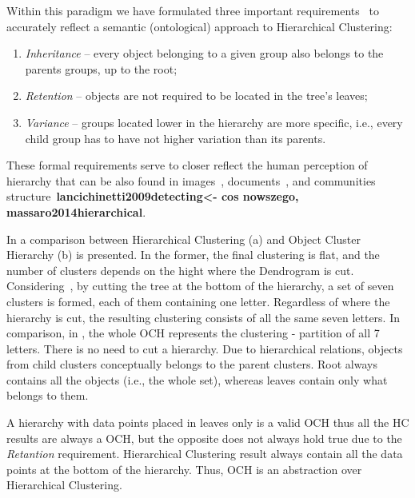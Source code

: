 \documentclass{article}
\begin{document}
    Within this paradigm we have formulated three important requirements~\cite{Spytkowski2012} to accurately reflect a semantic (ontological) approach to Hierarchical Clustering:
\begin{enumerate}
    \item {\textit{Inheritance} -- every object belonging to a given group also belongs to the parents groups, up to the root;}
    \item {\textit{Retention} -- objects are not required to be located in the tree’s leaves;}
    \item {\textit{Variance} -- groups located lower in the hierarchy are more specific, i.e., every child group has to have not higher variation than its parents.}
\end{enumerate}

These formal requirements serve to closer reflect the human perception of hierarchy that can be also found in images~\cite{ILSVRC15,ghahramani2010tree}, documents~\cite{ghahramani2010tree,2010_bayesian_rose_trees}, and communities structure~\textbf{lancichinetti2009detecting<- cos nowszego, massaro2014hierarchical}.

In  a comparison between Hierarchical Clustering (a) and Object Cluster Hierarchy (b) is presented. In the former, the final clustering is flat, and the number of clusters depends on the hight where the Dendrogram is cut. Considering~, by cutting the tree at the bottom of the hierarchy, a set of seven clusters is formed, each of them containing one letter. Regardless of where the hierarchy is cut, the resulting clustering consists of all the same seven letters. In comparison, in , the whole OCH represents the clustering - partition of all 7 letters. There is no need to cut a hierarchy. Due to hierarchical relations, objects from child clusters conceptually belongs to the parent clusters. Root always contains all the objects (i.e., the whole set), whereas leaves contain only what belongs to them.

A hierarchy with data points placed in leaves only is a valid OCH thus all the HC results are always a OCH, but the opposite does not always hold true due to the \textit{Retantion} requirement. Hierarchical Clustering result always contain all the data points at the bottom of the hierarchy. Thus, OCH is an abstraction over Hierarchical Clustering.
\end{document}
